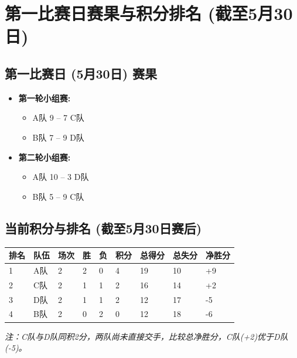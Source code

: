 \documentclass{ctexart}
\begin{document}
\newpage %

\section{第一比赛日赛果与积分排名 (截至5月30日)}

\subsection*{第一比赛日 (5月30日) 赛果}
\begin{itemize}
    \item \textbf{第一轮小组赛:}
    \begin{itemize}
        \item A队 9 -- 7 C队
        \item B队 7 -- 9 D队
    \end{itemize}
    \item \textbf{第二轮小组赛:}
    \begin{itemize}
        \item A队 10 -- 3 D队
        \item B队 5 -- 9 C队
    \end{itemize}
\end{itemize}

\subsection*{当前积分与排名 (截至5月30日赛后)}
\renewcommand{\arraystretch}{1.3}
\begin{tabularx}{\textwidth}{@{} M{1.2cm} M{1.2cm} M{1cm} M{1cm} M{1cm} M{1.2cm} M{1.5cm} M{1.5cm} M{1.5cm} @{}}
    \toprule
    \textbf{排名} & \textbf{队伍} & \textbf{场次} & \textbf{胜} & \textbf{负} & \textbf{积分} & \textbf{总得分} & \textbf{总失分} & \textbf{净胜分} \\
     & A队 & 2 & 2 & 0 & 4 & 19 & 10 & +9 \\
    2 & C队 & 2 & 1 & 1 & 2 & 16 & 14 & +2 \\
    3 & D队 & 2 & 1 & 1 & 2 & 12 & 17 & -5 \\
    4 & B队 & 2 & 0 & 2 & 0 & 12 & 18 & -6 \\
    \bottomrule
\end{tabularx}
\renewcommand{\arraystretch}{1.0}
\vspace{0.5em} %
\textit{注：C队与D队同积2分，两队尚未直接交手，比较总净胜分，C队(+2)优于D队(-5)。}

\newpage
\end{document}
